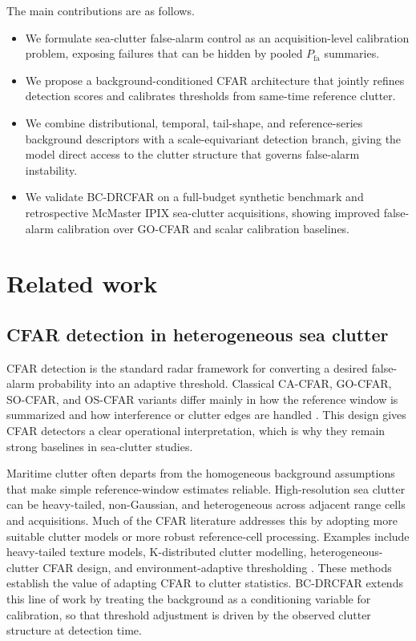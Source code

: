 \documentclass[preprint,12pt]{elsarticle}
\begin{document}
The main contributions are as follows.
\begin{itemize}
\item We formulate sea-clutter false-alarm control as an acquisition-level
calibration problem, exposing failures that can be hidden by pooled
$P_{\mathrm{fa}}$ summaries.
\item We propose a background-conditioned CFAR architecture that jointly refines
detection scores and calibrates thresholds from same-time reference clutter.
\item We combine distributional, temporal, tail-shape, and reference-series
background descriptors with a scale-equivariant detection branch, giving the
model direct access to the clutter structure that governs false-alarm
instability.
\item We validate BC-DRCFAR on a full-budget synthetic benchmark and
retrospective McMaster IPIX sea-clutter acquisitions, showing improved
false-alarm calibration over GO-CFAR and scalar calibration baselines.
\end{itemize}

\section{Related work}
\label{sec:related-work}

\subsection{CFAR detection in heterogeneous sea clutter}

CFAR detection is the standard radar framework for converting a desired
false-alarm probability into an adaptive threshold. Classical CA-CFAR,
GO-CFAR, SO-CFAR, and OS-CFAR variants differ mainly in how the reference
window is summarized and how interference or clutter edges are handled
\cite{hansen1980go,rohling1983cfar,barkat1989multiple}. This design gives CFAR
detectors a clear operational interpretation, which is why they remain strong
baselines in sea-clutter studies.

Maritime clutter often departs from the homogeneous background assumptions that
make simple reference-window estimates reliable. High-resolution sea clutter can
be heavy-tailed, non-Gaussian, and heterogeneous across adjacent range cells and
acquisitions. Much of the CFAR literature addresses this by adopting more
suitable clutter models or more robust reference-cell processing. Examples
include heavy-tailed texture models, K-distributed clutter modelling,
heterogeneous-clutter CFAR design, and
environment-adaptive thresholding
\cite{sekine1983weibull,watts1987spatial,xue2022adaptive,zhao2019dbscan,mungara2024heterogeneous,rihan2024cfar,xiao2024alternate,aldabaa2025multiple,hop2025twostage}.
These methods establish the value of adapting CFAR to clutter statistics.
BC-DRCFAR extends this line of work by treating the background as a conditioning
variable for calibration, so that threshold adjustment is driven by the observed
clutter structure at detection time.
\end{document}
